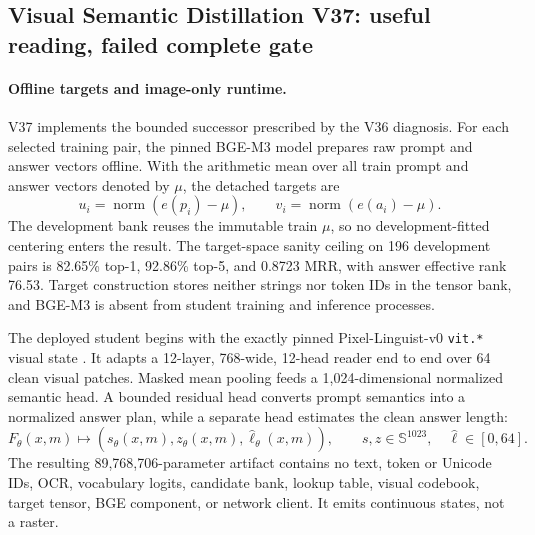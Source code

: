 \documentclass[11pt]{article}
\begin{document}
\subsection{Visual Semantic Distillation V37: useful reading, failed complete gate}

\paragraph{Offline targets and image-only runtime.}
V37 implements the bounded successor prescribed by the V36 diagnosis. For each
selected training pair, the pinned BGE-M3 model \cite{bgem3} prepares raw
prompt and answer vectors offline. With the arithmetic mean over all train
prompt and answer vectors denoted by \(\mu\), the detached targets are
\[
u_i=\operatorname{norm}(e(p_i)-\mu),\qquad
v_i=\operatorname{norm}(e(a_i)-\mu).
\]
The development bank reuses the immutable train \(\mu\), so no
development-fitted centering enters the result. The target-space sanity ceiling
on 196 development pairs is 82.65\% top-1, 92.86\% top-5, and 0.8723 MRR,
with answer effective rank 76.53. Target construction stores neither strings
nor token IDs in the tensor bank, and BGE-M3 is absent from student training
and inference processes.

The deployed student begins with the exactly pinned Pixel-Linguist-v0
\texttt{vit.*} visual state \cite{pixelsentence}. It adapts a 12-layer,
768-wide, 12-head reader end to end over 64 clean visual patches. Masked mean
pooling feeds a 1,024-dimensional normalized semantic head. A bounded residual
head converts prompt semantics into a normalized answer plan, while a separate
head estimates the clean answer length:
\[
F_\theta(x,m)\longmapsto
\left(s_\theta(x,m),z_\theta(x,m),\hat\ell_\theta(x,m)\right),
\qquad s,z\in\mathbb S^{1023},\quad \hat\ell\in[0,64].
\]
The resulting 89,768,706-parameter artifact contains no text, token or Unicode
IDs, OCR, vocabulary logits, candidate bank, lookup table, visual codebook,
target tensor, BGE component, or network client. It emits continuous states,
not a raster.
\end{document}
